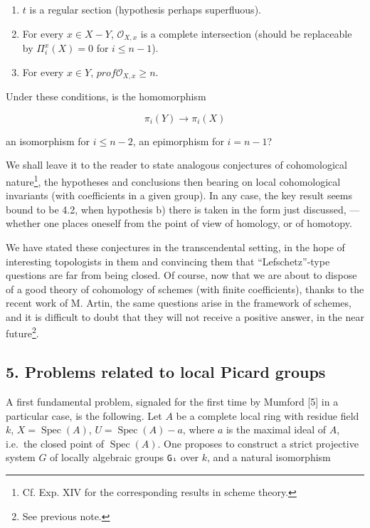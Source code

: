 \documentclass[
]{article}
\begin{document}
\begin{enumerate}
\def\labelenumi{\alph{enumi})}
\item
  \(t\) is a regular section (hypothesis perhaps superfluous).
\item
  For every \(x \in X - Y\), \(\mathcal{O}_{X,x}\) is a complete
  intersection (should be replaceable by \(\Pi^{x}_{i}(X) = 0\) for
  \(i \leqslant n - 1\)).
\item
  For every \(x \in Y\), \(prof \mathcal{O}_{X,x} \geqslant n\).
\end{enumerate}

Under these conditions, is the homomorphism

\[
\pi_{i}(Y) \to \pi_{i}(X)
\]

an isomorphism for \(i \leqslant n - 2\), an epimorphism for
\(i = n - 1\)?

We shall leave it to the reader to state analogous conjectures of
cohomological nature\footnote{Cf. Exp. XIV for the corresponding results
  in scheme theory.}, the hypotheses and conclusions then bearing on
local cohomological invariants (with coefficients in a given group). In
any case, the key result seems bound to be 4.2, when hypothesis b) there
is taken in the form just discussed, --- whether one places oneself from
the point of view of homology, or of homotopy.

We have stated these conjectures in the transcendental setting, in the
hope of interesting topologists in them and convincing them that
``Lefschetz''-type questions are far from being closed. Of course, now
that we are about to dispose of a good theory of cohomology of schemes
(with finite coefficients), thanks to the recent work of M. Artin, the
same questions arise in the framework of schemes, and it is difficult to
doubt that they will not receive a positive answer, in the near
future\footnote{See previous note.}.

\subsection{5. Problems related to local Picard
groups}\label{problems-related-to-local-picard-groups}

A first fundamental problem, signaled for the first time by Mumford
{[}5{]} in a particular case, is the following. Let \(A\) be a complete
local ring with residue field \(k\), \(X = \operatorname{Spec}(A)\),
\(U = \operatorname{Spec}(A) - {a}\), where \(a\) is the maximal ideal
of \(A\), i.e.~the closed point of \(\operatorname{Spec}(A)\). One
proposes to construct a strict projective system \(G\) of locally
algebraic groups \texttt{Gᵢ} over \(k\), and a natural isomorphism
\end{document}

